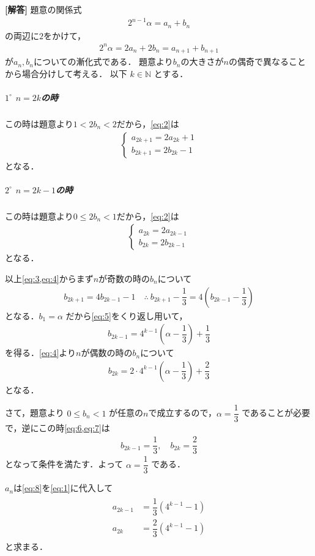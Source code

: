 \documentclass[../../main.tex]{subfiles}
\begin{document}
\begin{oframed}
  
\end{oframed}

{\bf [解答]}
題意の関係式
\begin{align}
  2^{n-1}\alpha=a_n+b_n \label{eq:1}
\end{align}
の両辺に$2$をかけて，
\begin{align}
  2^n\alpha=2a_n+2b_n=a_{n+1}+b_{n+1} \label{eq:2}
\end{align}
が$a_n, b_n$についての漸化式である．
題意より$b_n$の大きさが$n$の偶奇で異なることから場合分けして考える．
以下 $k\in\mathbb{N}$ とする．

\subparagraph{$1^\circ$ $n=2k$の時}
この時は題意より$1<2b_n<2$だから，\cref{eq:2}は
\begin{align}
  \begin{cases}\displaystyle
    a_{2k+1}=2a_{2k}+1 \\
    b_{2k+1}=2b_{2k}-1
  \end{cases}
  \label{eq:3}
\end{align}
となる．

\subparagraph{$2^\circ$ $n=2k-1$の時}
この時は題意より$0\le2b_n<1$だから，\cref{eq:2}は
\begin{align}
  \begin{cases}\displaystyle
    a_{2k}=2a_{2k-1} \\
    b_{2k}=2b_{2k-1}
  \end{cases}
  \label{eq:4}
\end{align}
となる．
\casesend

以上\cref{eq:3,eq:4}からまず$n$が奇数の時の$b_n$について
\begin{align}
  b_{2k+1}=4b_{2k-1}-1 \quad\therefore\ b_{2k+1}-\dfrac{1}{3}=4\left(b_{2k-1}-\dfrac{1}{3}\right) \label{eq:5}
\end{align}
となる．$b_1=\alpha$ だから\cref{eq:5}をくり返し用いて，
\begin{align}
  b_{2k-1}=4^{k-1}\left(\alpha-\dfrac{1}{3}\right)+\dfrac{1}{3}  \label{eq:6}
\end{align}
を得る．\cref{eq:4}より$n$が偶数の時の$b_n$について
\begin{align}
  b_{2k}=2\cdot4^{k-1}\left(\alpha-\dfrac{1}{3}\right)+\dfrac{2}{3} \label{eq:7}
\end{align}
となる．

さて，題意より $0\le b_n<1$ が任意の$n$で成立するので，$\alpha=\dfrac{1}{3}$ であることが必要で，逆にこの時\cref{eq:6,eq:7}は
\begin{align}
  b_{2k-1}=\dfrac{1}{3},\quad b_{2k}=\dfrac{2}{3} \label{eq:8}
\end{align}
となって条件を満たす．よって $\alpha=\dfrac{1}{3}$ である．

$a_n$は\cref{eq:8}を\cref{eq:1}に代入して
\begin{align}
  \begin{split}
    a_{2k-1}&=\dfrac{1}{3}\left(4^{k-1}-1\right) \\
    a_{2k}&=\dfrac{2}{3}\left(4^{k-1}-1\right)
  \end{split}
\end{align}
と求まる．

\newpage
\end{document}
